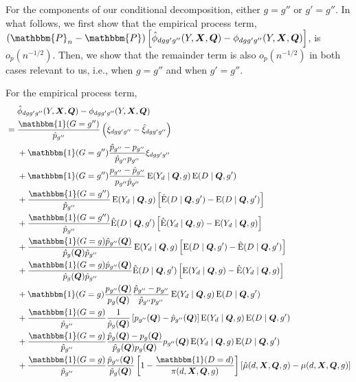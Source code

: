 \documentclass[12pt,a4paper]{article}
\newcommand{\E}{\operatorname{E}}
\def\X{{\boldsymbol X}}
\def\Q{{\boldsymbol Q}}
\def\one{\mathbbm{1}}
\def\P{\mathbbm{P}}
\begin{document}
For the components of our conditional decomposition, either $g=g''$ or $g'=g''$. In what follows, we first show that the empirical process term, $(\P_n-\P) \left[ \hat{\phi}_{dgg'g''}(Y,\X,\Q)- \phi_{dgg'g''}(Y,\X,\Q) \right]$, is $o_p(n^{-1/2})$. Then, we show that the remainder term is also $o_p(n^{-1/2})$ in both cases relevant to us, i.e., when $g=g''$ and when $g'=g''$.

For the empirical process term, 
\begin{align*}
    &\phantom{{}={}} \hat{\phi}_{dgg'g''}(Y,\X,\Q)-\phi_{dgg'g''}(Y,\X,\Q) \\
    &= \frac{\one(G=g'')}{\hat{p}_{g''}}\left(\xi_{dgg'g''}-\hat{\xi}_{dgg'g''}\right) \\
    &\phantom{{}={}} + \one(G=g'')\frac{\hat{p}_{g''}-p_{g''}}{\hat{p}_{g''}p_{g''}} \xi_{dgg'g''} \\
    &\phantom{{}={}} + \one(G=g'')\frac{p_{g''}-\hat{p}_{g''}}{p_{g''}\hat{p}_{g''}}\E(Y_d \mid \Q,g)\E(D \mid \Q,g') \\
    &\phantom{{}={}} + \frac{\one(G=g'')}{\hat{p}_{g''}} \E(Y_d \mid \Q,g)\left[ \hat{\E}(D \mid \Q,g')-\E(D \mid \Q,g')\right] \\
    &\phantom{{}={}} + \frac{\one(G=g'')}{\hat{p}_{g''}} \hat{\E}(D \mid \Q,g')\left[\hat{\E}(Y_d \mid \Q,g)-\E(Y_d \mid \Q,g) \right] \\
    &\phantom{{}={}} + \frac{\one(G=g) \hat{p}_{g''}(\Q)}{\hat{p}_{g}(\Q) \hat{p}_{g''}} \E(Y_d \mid \Q,g) \left[ \E(D \mid \Q,g')-\hat{\E}(D \mid \Q,g') \right] \\
    &\phantom{{}={}} + \frac{\one(G=g) \hat{p}_{g''}(\Q)}{\hat{p}_{g}(\Q) \hat{p}_{g''}} \hat{\E}(D \mid \Q,g')\left[\E(Y_d \mid \Q,g)-\hat{\E}(Y_d \mid \Q,g) \right] \\
    &\phantom{{}={}} + \one(G=g)\frac{p_{g''}(\Q)}{p_g(\Q)}\frac{\hat{p}_{g''}-p_{g''}}{\hat{p}_{g''}p_{g''}} \E(Y_d \mid \Q,g)\E(D \mid \Q,g') \\
    &\phantom{{}={}} + \frac{\one(G=g)}{\hat{p}_{g''}}\frac{1}{\hat{p}_g(\Q)}\left[p_{g''}(\Q)-\hat{p}_{g''}(\Q) \right] \E(Y_d \mid \Q,g)\E(D \mid \Q,g') \\
    &\phantom{{}={}} + \frac{\one(G=g)}{\hat{p}_{g''}} \frac{\hat{p}_g(\Q)-p_g(\Q)}{\hat{p}_g(\Q)p_g(\Q)} p_{g''}(\Q)\E(Y_d \mid \Q,g)\E(D \mid \Q,g') \\
    &\phantom{{}={}} + \frac{\one(G=g)}{\hat{p}_{g''}}\frac{\hat{p}_{g''}(\Q)}{\hat{p}_{g}(\Q)} \left[ 1-\frac{\one(D=d)}{\pi(d,\X,\Q,g)} \right] \left[\hat{\mu}(d,\X,\Q,g)-\mu(d,\X,\Q,g)\right] \\

\end{align*}
\end{document}
